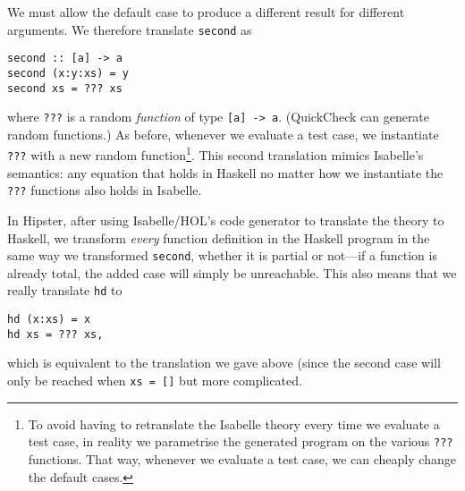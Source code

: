 We must allow the default case to produce a different result for
different arguments. We therefore translate \verb|second| as
\begin{verbatim}
second :: [a] -> a
second (x:y:xs) = y
second xs = ??? xs
\end{verbatim}
where \verb|???| is a random \emph{function} of type \verb|[a] -> a|.
(QuickCheck can generate random functions.) As before, whenever we
evaluate a test case, we instantiate \verb|???| with a new random
function\footnote{To avoid having to retranslate the Isabelle theory
every time we evaluate a test case, in reality we parametrise the
generated program on the various \texttt{???} functions. That way,
whenever we evaluate a test case, we can cheaply change the default cases.}.
This second translation mimics Isabelle's semantics: any equation that
holds in Haskell no matter how we instantiate the \verb|???| functions
also holds in Isabelle.

In Hipster, after using Isabelle/HOL's code generator to translate the
theory to Haskell, we transform \emph{every} function definition in the
Haskell program in the same way we transformed \verb|second|, whether it is
partial or not---if a function is already total, the added case will
simply be unreachable. This also means that we really translate \verb|hd| to
\begin{verbatim}
hd (x:xs) = x
hd xs = ??? xs,
\end{verbatim}
which is equivalent to the translation we gave above (since the second case
will only be reached when \verb|xs = []| but more complicated.
